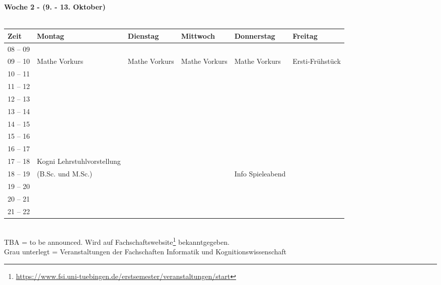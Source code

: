 \textbf{Woche 2 - (9. - 13. Oktober)}\\
\\
\begin{tabular}{|l|p{}|p{}|p{}|p{}|p{}|} \hline
 Zeit & Montag & Dienstag & Mittwoch & Donnerstag & Freitag \\ \hline \hline
 08 -- 09 & & & & & \\ \cline{1-5}
 09 -- 10 & \footnotesize{Mathe Vorkurs} & \footnotesize{Mathe Vorkurs} & \footnotesize{Mathe Vorkurs} & \footnotesize{Mathe Vorkurs} & \scriptsize{Ersti-Frühstück}\cellcolor{lightlightgray} \\ \cline{1-1}
 10 -- 11 & & & & &\cellcolor{lightlightgray} \\ \cline{1-1}
 11 -- 12 & & & & & \\ \cline{1-1}
 12 -- 13 & & & & & \\ \cline{1-1}
 13 -- 14 & & & & & \\ \cline{1-1}
 14 -- 15 & & & & & \\ \cline{1-1}
 15 -- 16 & & & & & \\ \cline {1-5}
 16 -- 17 & & & & & \\ \cline{1-1}
 17 -- 18 & \scriptsize{Kogni Lehr\-stuhl\-vor\-stell\-ung} & & & & \\ \cline{1-1}
 18 -- 19 &\scriptsize{(B.Sc. und M.Sc.)} & & & \scriptsize{Info Spieleabend} \cellcolor{lightlightgray}& \\ \cline{1-1}
 19 -- 20 &  & & &  \cellcolor{lightlightgray}& \\ \cline{1-1}
 20 -- 21 & & &  & \cellcolor{lightlightgray}&  \\ \cline{1-1}
 21 -- 22 &  & &  & \cellcolor{lightlightgray}& \\ \hline
\end{tabular}
\\
\scriptsize{TBA = to be announced. Wird auf Fachschaftswebsite\footnote{\url{https://www.fsi.uni-tuebingen.de/erstsemester/veranstaltungen/start}}  bekanntgegeben.} \\
\scriptsize{Grau unterlegt = Veranstaltungen der Fachschaften Informatik und Kognitionswissenschaft }
\newpage


